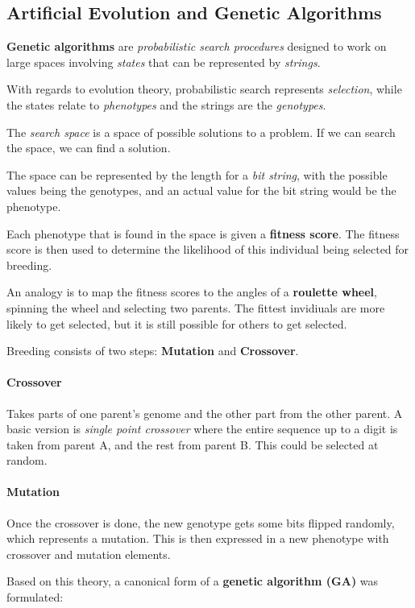 \subsection{Artificial Evolution and Genetic Algorithms}

\textbf{Genetic algorithms} are \textit{probabilistic search procedures} designed to work on large spaces involving \textit{states} that can be represented by \textit{strings}.

With regards to evolution theory, probabilistic search represents \textit{selection}, while the states relate to \textit{phenotypes} and the strings are the \textit{genotypes}.

The \textit{search space} is a space of possible solutions to a problem. If we can search the space, we can find a solution.

The space can be represented by the length for a \textit{bit string}, with the possible values being the genotypes, and an actual value for the bit string would be the phenotype.

Each phenotype that is found in the space is given a \textbf{fitness score}. The fitness score is then used to determine the likelihood of this individual being selected for breeding.

An analogy is to map the fitness scores to the angles of a \textbf{roulette wheel}, spinning the wheel and selecting two parents. The fittest invidiuals are more likely to get selected, but it is still possible for others to get selected.

Breeding consists of two steps: \textbf{Mutation} and \textbf{Crossover}.

\paragraph{Crossover} Takes parts of one parent's genome and the other part from the other parent. A basic version is \textit{single point crossover} where the entire sequence up to a digit is taken from parent A, and the rest from parent B. This could be selected at random.

\paragraph{Mutation} Once the crossover is done, the new genotype gets some bits flipped randomly, which represents a mutation. This is then expressed in a new phenotype with crossover and mutation elements.


Based on this theory, a canonical form of a \textbf{genetic algorithm (GA)} was formulated:

